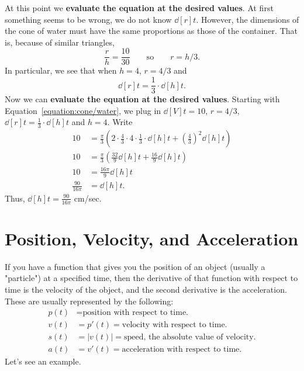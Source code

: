 \begin{example}
\begin{solution}
    At this point we \textbf{evaluate the equation at the desired values}.
    At first something seems to be wrong, we do not know $\dd[r]{t}$.
    However, the dimensions of the cone of water must have the same
    proportions as those of the container.  That is, because of similar
    triangles, 
    \[
    \frac{r}{h}=\frac{10}{30} \qquad\text{so}\qquad r={h/3}.
    \]  
    In particular, we see that when $h = 4$, $r=4/3$ and 
    \[
    \dd[r]{t} = \frac{1}{3}\cdot \dd[h]{t}.
    \]
    Now we can \textbf{evaluate the equation at the desired
      values}. Starting with Equation~\ref{equation:cone/water}, we plug
    in $\dd[V]{t} = 10$, $r = 4/3$, $\dd[r]{t} = \frac{1}{3}\cdot \dd[h]{t}$
    and $h=4$. Write
    \begin{align*}
    10 &= \frac{\pi}{3}\left(2\cdot \frac{4}{3}\cdot 4 \cdot\frac{1}{3}\cdot\dd[h]{t} + \left(\frac{4}{3}\right)^2 \dd[h]{t}\right)\\
    10 &= \frac{\pi}{3}\left(\frac{32}{9}\dd[h]{t} + \frac{16}{9} \dd[h]{t}\right)\\
    10 &= \frac{16\pi}{9}\dd[h]{t}\\
    \frac{90}{16\pi} &= \dd[h]{t}.
    \end{align*}
    Thus, $\dd[h]{t}=\frac{90}{16\pi}$ cm/sec.
    \end{solution}
\end{example}

\section{Position, Velocity, and Acceleration}
If you have a function that gives you the position of an object (usually a "particle") at a specified time, then the derivative of that function with respect to time is the velocity of the object, and the second derivative is the acceleration. These are usually represented by the following: \cite{ap}
\begin{align*}
    p(t) &= \text{position with respect to time.}\\
    v(t) &= p'(t) = \text{velocity with respect to time.}\\
    s(t) &= |v(t)| = \text{speed, the absolute value of velocity.}\\
    a(t) &=v'(t) = \text{acceleration with respect to time.}
\end{align*}
Let's see an example.

